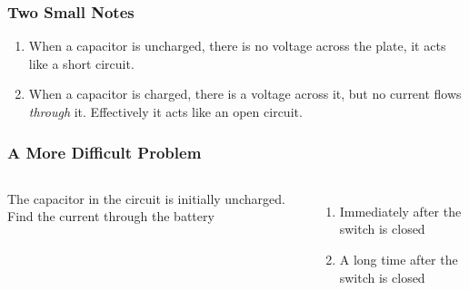 \documentclass[12pt,aspectratio=169]{beamer}
\begin{document}
\begin{frame}
  \frametitle{Two Small Notes}
  \begin{enumerate}
  \item When a capacitor is uncharged, there is no voltage across the plate,
    it acts like a short circuit.
  \item When a capacitor is charged, there is a voltage across it, but no
    current flows \emph{through} it. Effectively it acts like an open circuit.
  \end{enumerate}
\end{frame}

\begin{frame}
  \frametitle{A More Difficult Problem}
  \begin{columns}
    The capacitor in the circuit is initially uncharged. Find the current
    through the battery
    \begin{enumerate}
    \item Immediately after the switch is closed
    \item A long time after the switch is closed
    \end{enumerate}
  \end{columns}
\end{frame}
\end{document}

